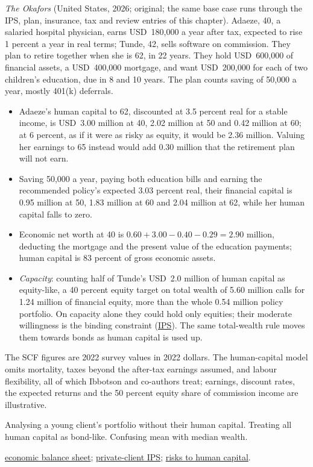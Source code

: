 \begin{qfmethod}
 \emph{The Okafors} (United States, 2026; original; the same base case runs through the IPS, plan, insurance, tax and review entries of this chapter). Adaeze, 40, a salaried hospital physician, earns USD~180,000 a year after tax, expected to rise 1 percent a year in real terms; Tunde, 42, sells software on commission. They plan to retire together when she is 62, in 22 years. They hold USD~600,000 of financial assets, a USD~400,000 mortgage, and want USD~200,000 for each of two children's education, due in 8 and 10 years. The plan counts saving of 50,000 a year, mostly 401(k) deferrals.
\begin{itemize}
\item Adaeze's human capital to 62, discounted at 3.5 percent real for a stable income, is USD~3.00 million at 40, 2.02 million at 50 and 0.42 million at 60; at 6 percent, as if it were as risky as equity, it would be 2.36 million. Valuing her earnings to 65 instead would add 0.30 million that the retirement plan will not earn.
\item Saving 50,000 a year, paying both education bills and earning the recommended policy's expected 3.03 percent real, their financial capital is 0.95 million at 50, 1.83 million at 60 and 2.04 million at 62, while her human capital falls to zero.
\item Economic net worth at 40 is $0.60+3.00-0.40-0.29=2.90$ million, deducting the mortgage and the present value of the education payments; human capital is 83 percent of gross economic assets.
\item \emph{Capacity}: counting half of Tunde's USD~2.0 million of human capital as equity-like, a 40 percent equity target on total wealth of 5.60 million calls for 1.24 million of financial equity, more than the whole 0.54 million policy portfolio. On capacity alone they could hold only equities; their moderate willingness is the binding constraint (\hyperref[meth:private-client-ips]{IPS}). The same total-wealth rule moves them towards bonds as human capital is used up.
\end{itemize}

 The SCF figures are 2022 survey values in 2022 dollars. The human-capital model omits mortality, taxes beyond the after-tax earnings assumed, and labour flexibility, all of which Ibbotson and co-authors treat; earnings, discount rates, the expected returns and the 50 percent equity share of commission income are illustrative.

 Analysing a young client's portfolio without their human capital. Treating all human capital as bond-like. Confusing mean with median wealth.

 \hyperref[meth:economic-balance-sheet-allocation]{economic balance sheet}; \hyperref[meth:private-client-ips]{private-client IPS}; \hyperref[meth:human-capital-risks]{risks to human capital}.

\end{qfmethod}

